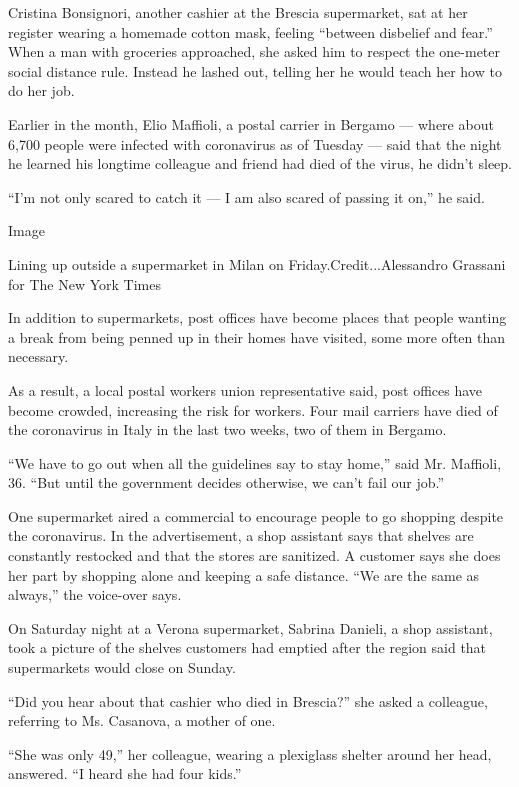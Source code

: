Cristina Bonsignori, another cashier at the Brescia supermarket, sat at
her register wearing a homemade cotton mask, feeling ``between disbelief
and fear.'' When a man with groceries approached, she asked him to
respect the one-meter social distance rule. Instead he lashed out,
telling her he would teach her how to do her job.

Earlier in the month, Elio Maffioli, a postal carrier in Bergamo ---
where about 6,700 people were infected with coronavirus as of Tuesday
--- said that the night he learned his longtime colleague and friend had
died of the virus, he didn't sleep.

``I'm not only scared to catch it --- I am also scared of passing it
on,'' he said.

Image

Lining up outside a supermarket in Milan on Friday.Credit...Alessandro
Grassani for The New York Times

In addition to supermarkets, post offices have become places that people
wanting a break from being penned up in their homes have visited, some
more often than necessary.

As a result, a local postal workers union representative said, post
offices have become crowded, increasing the risk for workers. Four mail
carriers have died of the coronavirus in Italy in the last two weeks,
two of them in Bergamo.

``We have to go out when all the guidelines say to stay home,'' said Mr.
Maffioli, 36. ``But until the government decides otherwise, we can't
fail our job.''

One supermarket aired a commercial to encourage people to go shopping
despite the coronavirus. In the advertisement, a shop assistant says
that shelves are constantly restocked and that the stores are sanitized.
A customer says she does her part by shopping alone and keeping a safe
distance. ``We are the same as always,'' the voice-over says.

On Saturday night at a Verona supermarket, Sabrina Danieli, a shop
assistant, took a picture of the shelves customers had emptied after the
region said that supermarkets would close on Sunday.

``Did you hear about that cashier who died in Brescia?'' she asked a
colleague, referring to Ms. Casanova, a mother of one.

``She was only 49,'' her colleague, wearing a plexiglass shelter around
her head, answered. ``I heard she had four kids.''

